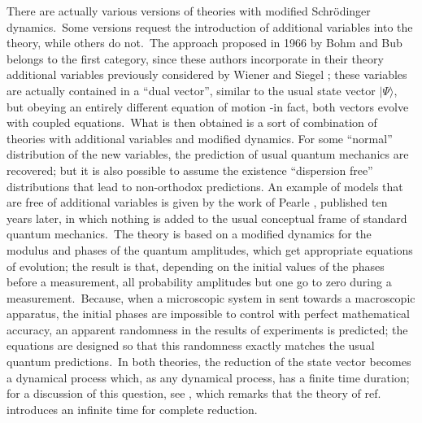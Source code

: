 \documentclass[12pt,onecolumn]{article}%
\begin{document}
There are actually various versions of theories with modified Schr\"{o}dinger
dynamics.\ Some versions request the introduction of additional variables into
the theory, while others do not.\ The approach proposed in 1966 by Bohm and
Bub \cite{Bohm-Bub-1} belongs to the first category, since these authors
incorporate in their theory additional variables previously considered by
Wiener and Siegel \cite{Wiener-Siegel}; these variables are actually contained
in a ``dual vector'', similar to the usual state vector $|\Psi\rangle $, but
obeying an entirely different equation of motion -in fact, both vectors evolve
with coupled equations.\ What is then obtained is a sort of combination of
theories with additional variables and modified dynamics. For some ``normal''
distribution of the new variables, the prediction of usual quantum mechanics
are recovered; but it is also possible to assume the existence ``dispersion
free'' distributions that lead to non-orthodox predictions. An example of
models that are free of additional variables is given by the work of Pearle
\cite{Pearle}, published ten years later, in which nothing is added to the
usual conceptual frame of standard quantum mechanics.\ The theory is based on
a modified dynamics for the modulus and phases of the quantum amplitudes,
which get appropriate equations of evolution; the result is that, depending on
the initial values of the phases before a measurement, all probability
amplitudes but one go to zero during a measurement.\ Because, when a
microscopic system in sent towards a macroscopic apparatus, the initial phases
are impossible to control with perfect mathematical accuracy, an apparent
randomness in the results of experiments is predicted; the equations are
designed so that this randomness exactly matches the usual quantum
predictions.\ In both theories, the reduction of the state vector becomes a
dynamical process which, as any dynamical process, has a finite time duration;
for a discussion of this question, see \cite{Pearle-4}, which remarks that the
theory of ref. \cite{Bohm-Bub-1} introduces an infinite time for complete reduction.
\end{document}
